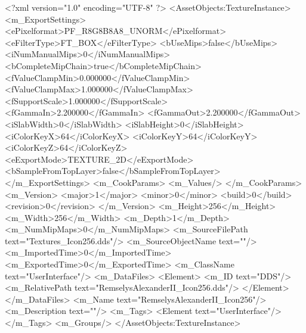 <?xml version="1.0" encoding="UTF-8" ?>
<AssetObjects:TextureInstance>
	<m_ExportSettings>
		<ePixelformat>PF_R8G8B8A8_UNORM</ePixelformat>
		<eFilterType>FT_BOX</eFilterType>
		<bUseMips>false</bUseMips>
		<iNumManualMips>0</iNumManualMips>
		<bCompleteMipChain>true</bCompleteMipChain>
		<fValueClampMin>0.000000</fValueClampMin>
		<fValueClampMax>1.000000</fValueClampMax>
		<fSupportScale>1.000000</fSupportScale>
		<fGammaIn>2.200000</fGammaIn>
		<fGammaOut>2.200000</fGammaOut>
		<iSlabWidth>0</iSlabWidth>
		<iSlabHeight>0</iSlabHeight>
		<iColorKeyX>64</iColorKeyX>
		<iColorKeyY>64</iColorKeyY>
		<iColorKeyZ>64</iColorKeyZ>
		<eExportMode>TEXTURE_2D</eExportMode>
		<bSampleFromTopLayer>false</bSampleFromTopLayer>
	</m_ExportSettings>
	<m_CookParams>
		<m_Values/>
	</m_CookParams>
	<m_Version>
		<major>1</major>
		<minor>0</minor>
		<build>0</build>
		<revision>0</revision>
	</m_Version>
	<m_Height>256</m_Height>
	<m_Width>256</m_Width>
	<m_Depth>1</m_Depth>
	<m_NumMipMaps>0</m_NumMipMaps>
	<m_SourceFilePath text="Textures\RemselysAlexanderII_Icon256.dds"/>
	<m_SourceObjectName text=""/>
	<m_ImportedTime>0</m_ImportedTime>
	<m_ExportedTime>0</m_ExportedTime>
	<m_ClassName text="UserInterface"/>
	<m_DataFiles>
		<Element>
			<m_ID text="DDS"/>
			<m_RelativePath text="RemselysAlexanderII_Icon256.dds"/>
		</Element>
	</m_DataFiles>
	<m_Name text="RemselysAlexanderII_Icon256"/>
	<m_Description text=""/>
	<m_Tags>
		<Element text="UserInterface"/>
	</m_Tags>
	<m_Groups/>
</AssetObjects:TextureInstance>
